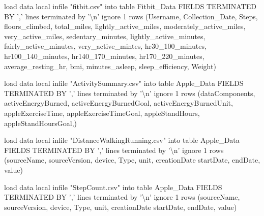 \documentclass[]{book}
\newenvironment{Shaded}{\begin{snugshade}}{\end{snugshade}}
\newcommand{\DecValTok}[1]{\textcolor[rgb]{0.00,0.00,0.81}{#1}}
\newcommand{\CharTok}[1]{\textcolor[rgb]{0.31,0.60,0.02}{#1}}
\newcommand{\StringTok}[1]{\textcolor[rgb]{0.31,0.60,0.02}{#1}}
\newcommand{\NormalTok}[1]{#1}
\begin{document}
\begin{Shaded}
\begin{Highlighting}[]
\NormalTok{load data local infile }\StringTok{"fitbit.csv"}\NormalTok{ into table Fitbit_Data}
\NormalTok{FIELDS TERMINATED BY }\StringTok{','} 
\NormalTok{     lines terminated by }\StringTok{'}\CharTok{\textbackslash{}n}\StringTok{'}
\NormalTok{     ignore }\DecValTok{1}\NormalTok{ rows}
\NormalTok{     (Username, Collection_Date, Steps, floors_climbed, total_miles, lightly_active_miles,}
\NormalTok{     moderately_active_miles, very_active_miles, sedentary_minutes,}
\NormalTok{     lightly_active_minutes, fairly_active_minutes,}
\NormalTok{     very_active_mintes,  }
\NormalTok{     hr30_}\DecValTok{100}\NormalTok{_minutes,}
\NormalTok{     hr100_}\DecValTok{140}\NormalTok{_minutes, hr140_}\DecValTok{170}\NormalTok{_minutes, hr170_}\DecValTok{220}\NormalTok{_minutes, average_resting_hr, bmi, minutes_asleep, sleep_efficiency, Weight)}



\NormalTok{load data local infile }\StringTok{"ActivitySummary.csv"}\NormalTok{ into table Apple_Data}
\NormalTok{FIELDS TERMINATED BY }\StringTok{','} 
\NormalTok{     lines terminated by }\StringTok{'}\CharTok{\textbackslash{}n}\StringTok{'}
\NormalTok{     ignore }\DecValTok{1}\NormalTok{ rows}
\NormalTok{     (dataComponents, }
\NormalTok{activeEnergyBurned, activeEnergyBurnedGoal, }
\NormalTok{activeEnergyBurnedUnit,}
\NormalTok{appleExerciseTime,}
\NormalTok{appleExerciseTimeGoal,}
\NormalTok{appleStandHours,}
\NormalTok{appleStandHoursGoal,)}


\NormalTok{load data local infile }\StringTok{"DistanceWalkingRunning.csv"}\NormalTok{ into table Apple_Data}
\NormalTok{FIELDS TERMINATED BY }\StringTok{','} 
\NormalTok{     lines terminated by }\StringTok{'}\CharTok{\textbackslash{}n}\StringTok{'}
\NormalTok{     ignore }\DecValTok{1}\NormalTok{ rows}
\NormalTok{     (sourceName, }
\NormalTok{sourceVersion, device, }
\NormalTok{Type,}
\NormalTok{unit,}
\NormalTok{creationDate}
\NormalTok{startDate,}
\NormalTok{endDate,}
\NormalTok{value)}

\NormalTok{load data local infile }
\StringTok{"StepCount.csv"}\NormalTok{ into table Apple_Data}
\NormalTok{FIELDS TERMINATED BY }\StringTok{','} 
\NormalTok{     lines terminated by }\StringTok{'}\CharTok{\textbackslash{}n}\StringTok{'}
\NormalTok{     ignore }\DecValTok{1}\NormalTok{ rows}
\NormalTok{     (sourceName, }
\NormalTok{sourceVersion, device, }
\NormalTok{Type,}
\NormalTok{unit,}
\NormalTok{creationDate}
\NormalTok{startDate,}
\NormalTok{endDate,}
\NormalTok{value)}


\end{Highlighting}
\end{Shaded}
\end{document}
